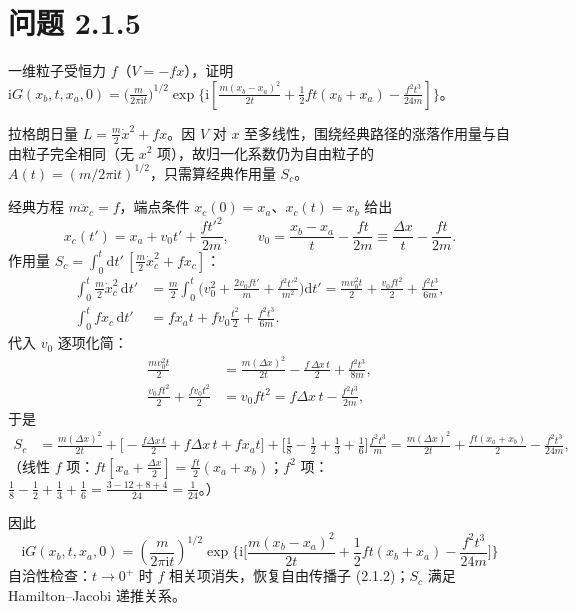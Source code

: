\section*{问题 2.1.5}
\begin{problem}
一维粒子受恒力 $f$（$V=-fx$），证明 $\mathrm{i}G(x_b,t,x_a,0)=\big(\frac{m}{2\pi\mathrm{i}t}\big)^{1/2}\exp\{\mathrm{i}[\frac{m(x_b-x_a)^2}{2t}+\frac12ft(x_b+x_a)-\frac{f^2t^3}{24m}]\}$。
\end{problem}
\solution
拉格朗日量 $L=\frac m2\dot x^2+fx$。因 $V$ 对 $x$ 至多线性，围绕经典路径的涨落作用量与自由粒子完全相同（无 $x^2$ 项），故归一化系数仍为自由粒子的 $A(t)=(m/2\pi\mathrm{i}t)^{1/2}$，只需算经典作用量 $S_c$。

经典方程 $m\ddot x_c=f$，端点条件 $x_c(0)=x_a$、$x_c(t)=x_b$ 给出
\begin{equation*}
x_c(t')=x_a+v_0t'+\frac{f t'^2}{2m},\qquad
v_0=\frac{x_b-x_a}{t}-\frac{ft}{2m}\equiv\frac{\Delta x}{t}-\frac{ft}{2m}.
\end{equation*}
作用量 $S_c=\int_0^t\mathrm{d}t'\,[\frac m2\dot x_c^2+fx_c]$：
\begin{align*}
\int_0^t\frac m2\dot x_c^2\,\mathrm{d}t'
&=\frac m2\int_0^t\Big(v_0^2+\frac{2v_0ft'}{m}+\frac{f^2t'^2}{m^2}\Big)\mathrm{d}t'
=\frac{mv_0^2t}{2}+\frac{v_0ft^2}{2}+\frac{f^2t^3}{6m},\\
\int_0^t fx_c\,\mathrm{d}t'
&=fx_at+fv_0\frac{t^2}{2}+\frac{f^2t^3}{6m}.
\end{align*}
代入 $v_0$ 逐项化简：
\begin{align*}
\frac{mv_0^2t}{2}&=\frac{m(\Delta x)^2}{2t}-\frac{f\,\Delta x\,t}{2}+\frac{f^2t^3}{8m},\\
\frac{v_0ft^2}{2}+\frac{fv_0t^2}{2}&=v_0ft^2=f\Delta x\,t-\frac{f^2t^3}{2m},
\end{align*}
于是
\begin{align*}
S_c&=\frac{m(\Delta x)^2}{2t}+\Big[-\frac{f\Delta x\,t}{2}+f\Delta x\,t+fx_at\Big]
+\Big[\frac18-\frac12+\frac13+\frac16\Big]\frac{f^2t^3}{m}
=\frac{m(\Delta x)^2}{2t}+\frac{ft(x_a+x_b)}{2}-\frac{f^2t^3}{24m},
\end{align*}
（线性 $f$ 项：$f t[x_a+\frac{\Delta x}2]=\frac{ft}2(x_a+x_b)$；$f^2$ 项：$\frac18-\frac12+\frac13+\frac16=\frac{3-12+8+4}{24}=\frac1{24}$。）

因此
\begin{equation*}
\boxed{\;\mathrm{i}G(x_b,t,x_a,0)=\left(\frac{m}{2\pi\mathrm{i}t}\right)^{1/2}
\exp\Big\{\mathrm{i}\Big[\frac{m(x_b-x_a)^2}{2t}+\frac12ft(x_b+x_a)-\frac{f^2t^3}{24m}\Big]\Big\}\;}
\end{equation*}
自洽性检查：$t\to0^+$ 时 $f$ 相关项消失，恢复自由传播子 (2.1.2)；$S_c$ 满足 Hamilton--Jacobi 递推关系。

